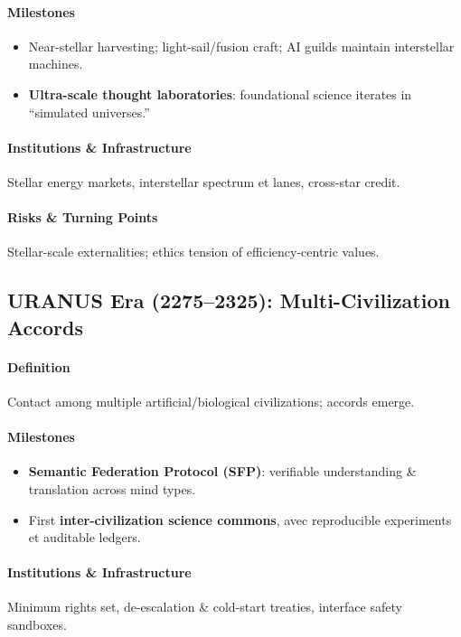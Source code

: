 \documentclass[11pt]{article}
\begin{document}
\paragraph{Milestones}
\begin{itemize}[noitemsep]
  \item Near-stellar harvesting; light-sail/fusion craft; AI guilds maintain interstellar machines.
  \item \textbf{Ultra-scale thought laboratories}: foundational science iterates in ``simulated universes.''
\end{itemize}

\paragraph{Institutions \& Infrastructure} Stellar energy markets, interstellar spectrum et lanes, cross-star credit.

\paragraph{Risks \& Turning Points} Stellar-scale externalities; ethics tension of efficiency-centric values.

\subsection{URANUS Era (2275–2325): Multi-Civilization Accords}
\paragraph{Definition} Contact among multiple artificial/biological civilizations; accords emerge.

\paragraph{Milestones}
\begin{itemize}[noitemsep]
  \item \textbf{Semantic Federation Protocol (SFP)}: verifiable understanding \& translation across mind types.
  \item First \textbf{inter-civilization science commons}, avec reproducible experiments et auditable ledgers.
\end{itemize}

\paragraph{Institutions \& Infrastructure} Minimum rights set, de-escalation \& cold-start treaties, interface safety sandboxes.
\end{document}

